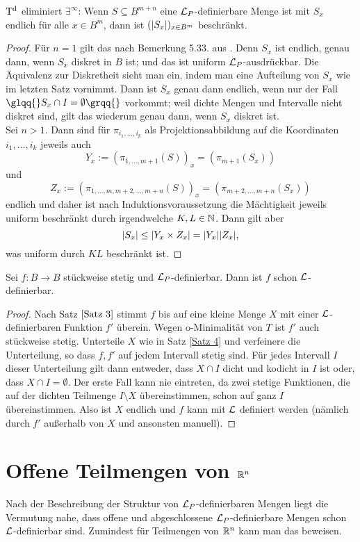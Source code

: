 \begin{lemma}
	$\operatorname{T^d}$ eliminiert $\exists^\infty$: Wenn $S\subseteq B^{m+n}$ eine $\mathcal{L}_P$-definierbare Menge ist mit $S_x$ endlich für alle $x\in B^m$, dann ist $({\left| S_x \right|})_{x\in B^m}$ beschränkt.
\end{lemma}
\begin{proof}
	Für $n=1$ gilt das nach Bemerkung 5.33. aus \cite{Lukas}. Denn $S_x$ ist endlich, genau dann, wenn $S_x$ diskret in $B$ ist; und das ist uniform $\mathcal{L}_P$-ausdrückbar. Die Äquivalenz zur Diskretheit sieht man ein, indem man eine Aufteilung von $S_x$ wie im letzten Satz vornimmt. Dann ist $S_x$ genau dann endlich, wenn nur der Fall $\glqq{}S_x\cap I=\emptyset\grqq{}$ vorkommt; weil dichte Mengen und Intervalle nicht diskret sind, gilt das wiederum genau dann, wenn $S_x$ diskret ist.\\
	Sei $n>1$. Dann sind für $\pi_{i_1,\dots,i_k}$ als Projektionsabbildung auf die Koordinaten $i_1,\dots,i_k$ jeweils auch $$Y_x:=(\pi_{1,\dots,m+1}(S))_x=(\pi_{m+1}(S_x))$$ und $$Z_x:=(\pi_{1,\dots,m,m+2,\dots,m+n}(S))_x=(\pi_{m+2,\dots,m+n}(S_x))$$ endlich und daher ist nach Induktionsvoraussetzung die Mächtigkeit jeweils uniform beschränkt durch irgendwelche $K,L\in\mathbb{N}$. Dann gilt aber $${\left| S_x \right|}\leq {\left| Y_x\times Z_x \right|}={\left| Y_x \right|}{\left| Z_x \right|},$$ was uniform durch $KL$ beschränkt ist.
\end{proof}

\begin{lemma}\label{Stückweise stetige Abbildungen}
	Sei $f:B\rightarrow B$ stückweise stetig und $\mathcal{L}_P$-definierbar. Dann ist $f$ schon $\mathcal{L}$-definierbar.
\end{lemma}
\begin{proof}
	Nach Satz $\ref{Satz 3}$ stimmt $f$ bis auf eine kleine Menge $X$ mit einer $\mathcal{L}$-definierbaren Funktion $f'$ überein. Wegen o-Minimalität von $T$ ist $f'$ auch stückweise stetig. Unterteile $X$ wie in Satz \ref{Satz 4} und verfeinere die Unterteilung, so dass $f,f'$ auf jedem Intervall stetig sind. Für jedes Intervall $I$ dieser Unterteilung gilt dann entweder, dass $X\cap I$ dicht und kodicht in $I$ ist oder, dass $X\cap I=\emptyset$. Der erste Fall kann nie eintreten, da zwei stetige Funktionen, die auf der dichten Teilmenge $I\setminus X$ übereinstimmen, schon auf ganz $I$ übereinstimmen. Also ist $X$ endlich und $f$ kann mit $\mathcal{L}$ definiert werden (nämlich durch $f'$ außerhalb von $X$ und ansonsten manuell).
\end{proof}

\section{Offene Teilmengen von $\mathbb{R}^n$}
Nach der Beschreibung der Struktur von $\mathcal{L}_P$-definierbaren Mengen liegt die Vermutung nahe, dass offene und abgeschlossene $\mathcal{L}_P$-definierbare Mengen schon $\mathcal{L}$-definierbar sind. Zumindest für Teilmengen von $\mathbb{R}^n$ kann man das beweisen.

